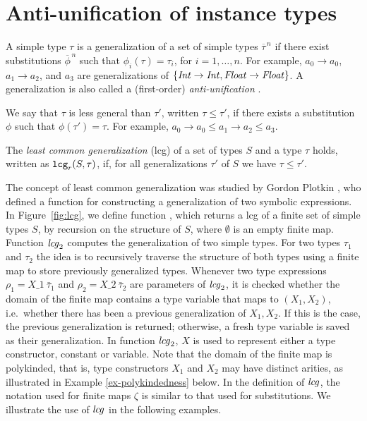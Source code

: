 \section{Anti-unification of instance types}
\label{sec:anti-unif}

A simple type $\tau$ is a generalization of a set of simple types
$\overline{\tau}^{\,n}$ if there exist substitutions
$\overline{\phi}^{\,n}$ such that $\phi_i(\tau)=\tau_i$, for
$i=1,\ldots,n$. For example, $a_0 \rightarrow a_0$, $a_1 \rightarrow
a_2$, and $a_3$ are generalizations of $\{ {\it Int\/} \rightarrow {\it Int\/},
{\it Float\/} \rightarrow {\it Float\/}\}$. A generalization is also called a
(first-order) {\em anti-unification\/} \cite{ModelTheory2012}.

We say that $\tau$ is less general than $\tau'$, written $\tau \leq
\tau'$, if there exists a substitution $\phi$ such that $\phi(\tau') =
\tau$.  For example, $a_0 \rightarrow a_0 \leq a_1 \rightarrow a_2
\leq a_3$.

The {\it least common generalization} (lcg) of a set of types
$S$ and a type $\tau$ holds, written as ${\tt lcg}_r(S,\tau)$, if, for all generalizations $\tau'$ of
$S$ we have $\tau \leq \tau'$.

The concept of least common generalization was studied by Gordon
Plotkin \cite{plotkin1970note,plotkin1971further}, who defined a
function for constructing a generalization of two symbolic
expressions.  In Figure~\ref{fig:lcg}, we define function \lcg, which
returns a lcg of a finite set of simple types $S$, by recursion on the
structure of $S$, where $\emptyset$ is an empty finite map. Function
${\it lcg\/}_2$ computes the generalization of two simple types. For two
types $\tau_1$ and $\tau_2$ the idea is to recursively traverse the
structure of both types using a finite map to store previously
generalized types. Whenever two type expressions $\rho_1 =
X\_1\:\bar{\tau}_1$ and $\rho_2 = X\_2\:\bar{\tau}_2$ are parameters
of ${\it lcg\/}_2$, it is checked whether the domain of the finite map
contains a type variable that maps to $(X_1, X_2)$, i.e.~whether there
has been a previous generalization of $X_1, X_2$. If this is the case,
the previous generalization is returned; otherwise, a fresh type
variable is saved as their generalization. In function ${\it lcg\/}_2$, $X$
is used to represent either a type constructor, constant or
variable. Note that the domain of the finite map is polykinded, that
is, type constructors $X_1$ and $X_2$ may have distinct arities, as
illustrated in Example \ref{ex-polykindedness} below. In the
definition of ${\it lcg\/}$, the notation used for finite maps $\zeta$ is
similar to that used for substitutions. We illustrate the use of
${\it lcg\/}$ in the following examples.

